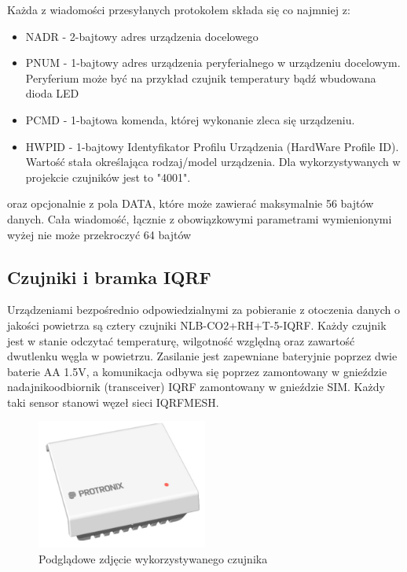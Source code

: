 \documentclass[a4paper, 12pt]{article}
\begin{document}
Każda z wiadomości przesyłanych protokołem składa się co najmniej z:
\begin{itemize}
    \item NADR - 2-bajtowy adres urządzenia docelowego
    \item PNUM - 1-bajtowy adres urządzenia peryferialnego w urządzeniu docelowym. Peryferium może być na przykład czujnik temperatury bądź wbudowana dioda LED
    \item PCMD - 1-bajtowa komenda, której wykonanie zleca się urządzeniu. 
    \item HWPID - 1-bajtowy Identyfikator Profilu Urządzenia (HardWare Profile ID). Wartość stała określająca rodzaj/model urządzenia. Dla wykorzystywanych w projekcie
czujników jest to "4001".
\end{itemize}

oraz opcjonalnie z pola DATA, które może zawierać maksymalnie 56 bajtów danych. Cała wiadomość, łącznie z obowiązkowymi parametrami wymienionymi wyżej nie może przekroczyć
64 bajtów

\subsection{Czujniki i bramka IQRF}

Urządzeniami bezpośrednio odpowiedzialnymi za pobieranie z otoczenia danych o jakości powietrza są cztery czujniki NLB-CO2+RH+T-5-IQRF.
Każdy czujnik jest w stanie odczytać temperaturę, wilgotność względną oraz zawartość dwutlenku węgla w powietrzu. Zasilanie jest zapewniane
bateryjnie poprzez dwie baterie AA 1.5V, a komunikacja odbywa się poprzez zamontowany w gnieździe nadajnikoodbiornik (transceiver) IQRF
zamontowany w gnieździe SIM. Każdy taki sensor stanowi węzeł sieci IQRFMESH.

\begin{figure}[H]
    \centering
    \includegraphics[width=0.5\textwidth]{zdj/NLB-CO2RHT-5-IQRF.jpg}
    \caption{Podglądowe zdjęcie wykorzystywanego czujnika}
\end{figure}
\end{document}
